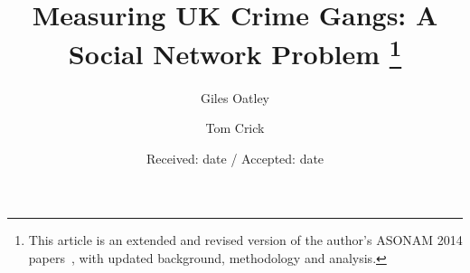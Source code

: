 \documentclass[twocolumn]{svjour3}          %
\theoremstyle{definition}
\begin{document}
\title{Measuring UK Crime Gangs: A Social Network Problem
\thanks{This article is an extended and revised version of the author's ASONAM
  2014 papers~\citep{oatley+crick_asonam2014,oatley+crick_fosintsi2014}, with updated background, methodology and analysis.}
}


\author{Giles Oatley \and Tom Crick}










\date{Received: date / Accepted: date}

\maketitle
\end{document}
